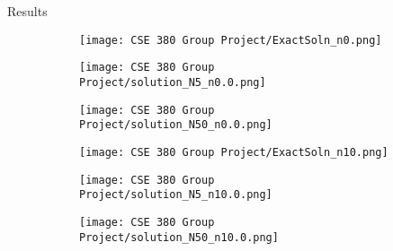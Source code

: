 \documentclass{beamer}
\begin{document}
\begin{frame}{Results}
    \begin{adjustwidth}{-1cm}{-1cm} 
        \begin{figure}[ht]
            \begin{subfigure}{0.33\textwidth}
                \texttt{[image: CSE 380 Group Project/ExactSoln\_n0.png]}
            \end{subfigure}
            \begin{subfigure}{0.33\textwidth}
                \texttt{[image: CSE 380 Group Project/solution\_N5\_n0.0.png]}
            \end{subfigure}
            \begin{subfigure}{0.33\textwidth}
                \texttt{[image: CSE 380 Group Project/solution\_N50\_n0.0.png]}
            \end{subfigure}
            
            \vspace{0.5cm} %
            
            \begin{subfigure}{0.33\textwidth}
                \texttt{[image: CSE 380 Group Project/ExactSoln\_n10.png]}
            \end{subfigure}
            \begin{subfigure}{0.33\textwidth}
                \texttt{[image: CSE 380 Group Project/solution\_N5\_n10.0.png]}
            \end{subfigure}
            \begin{subfigure}{0.33\textwidth}
                \texttt{[image: CSE 380 Group Project/solution\_N50\_n10.0.png]}
            \end{subfigure}
        \end{figure}
    \end{adjustwidth}
\end{frame}
\end{document}

